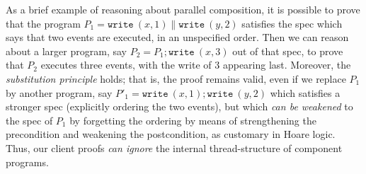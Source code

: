 
As a brief example of reasoning about parallel composition, it is
possible to prove that the program
%
$ 
P_1 = {\mathtt{write}}\ (x, 1) \parallel {\mathtt{write}}\ (y, 2)
$
%
satisfies the spec which says that two events are executed, in an
unspecified order. Then we can reason about a larger program, say
$
  P_2 = P_1; {\mathtt{write}}\ (x, 3)
$
out of that spec, to prove that $P_2$ executes three events, with the
write of $3$ appearing last. 
%
Moreover, the \emph{substitution principle} holds; that is, the proof
remains valid, even if we replace $P_1$ by another program, say
%
$
P'_1 = {\mathtt{write}}\ (x, 1); {\mathtt{write}}\ (y, 2)
$
which satisfies a stronger spec (explicitly ordering the two events),
but which \emph{can be weakened} to the spec of $P_1$ by forgetting the
ordering by means of strengthening the precondition and weakening the
postcondition, as customary in Hoare logic. Thus, our client proofs
\emph{can ignore} the internal thread-structure of component programs.



